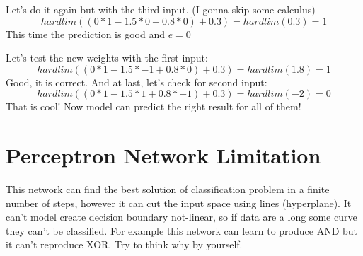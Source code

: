 Let's do it again but with the third input. (I gonna skip some calculus)
\begin{equation}
hardlim((0*1 - 1.5 * 0 + 0.8 * 0) + 0.3) = hardlim(0.3) = 1 
\end{equation}
This time the prediction is good and $e = 0$

Let's test the new weights with the first input:
\begin{equation}
hardlim((0*1 - 1.5 * -1 + 0.8 * 0) + 0.3) = hardlim(1.8) = 1 
\end{equation}
Good, it is correct. And at last, let's check for second input:
\begin{equation}
hardlim((0*1 - 1.5 * 1 + 0.8 * -1) + 0.3) = hardlim(-2) = 0 
\end{equation}
That is cool! Now model can predict the right result for all of them!



\section{Perceptron Network Limitation}

This network can find the best solution of classification problem in a finite number of steps, however it can cut the input space using lines (hyperplane). It can't model create decision boundary not-linear, so if data are a long some curve they can't be classified. For example this network can learn to produce AND but it can't reproduce XOR. Try to think why by yourself.


